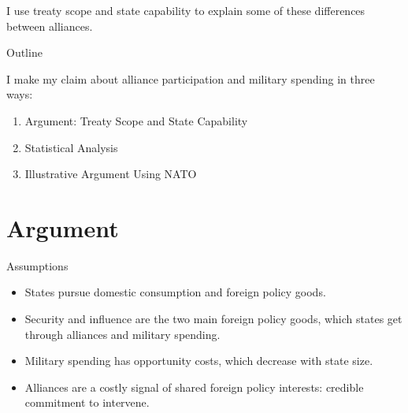 \documentclass{beamer}
\begin{document}
 \begin{frame}[standout]

I use treaty scope and state capability to explain some of these differences between alliances. 

 \end{frame}




\begin{frame}{Outline}

I make my claim about alliance participation and military spending in three ways: 

\pause
\begin{enumerate}
\item Argument: Treaty Scope and State Capability
\pause
\item Statistical Analysis
\pause
\item Illustrative Argument Using NATO
\end{enumerate}


\end{frame}


\section{Argument}


\begin{frame}{Assumptions}

\begin{itemize} 
\item States pursue domestic consumption and foreign policy goods. 
\pause 
\item Security and influence are the two main foreign policy goods, which states get through alliances and military spending.  
\pause 
\item Military spending has opportunity costs, which decrease with state size. 
\pause 
\item Alliances are a costly signal of shared foreign policy interests: credible commitment to intervene.  
\end{itemize}


\end{frame}

\end{document}
